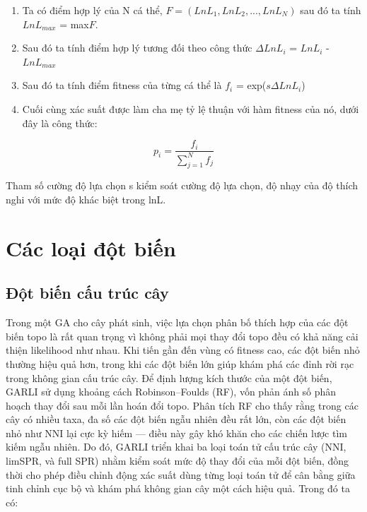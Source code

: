 \documentclass[12pt,a4paper]{report}
\begin{document}
\begin{enumerate}
    \item Ta có điểm hợp lý của N cá thể, \(F = (LnL_1, LnL_2 , ..., LnL_N)\) sau đó ta tính \(LnL_{max}\) = max\(F\).
    \item Sau đó ta tính điểm hợp lý tương đối theo công thức \(\Delta LnL_i\) = \(LnL_i\) - \(LnL_{max}\) 
    \item Sau đó ta tính điểm fitness của từng cá thể là \(f_i\) = exp(\(s\Delta LnL_i\))
    \item Cuối cùng xác suất được làm cha mẹ tỷ lệ thuận với hàm fitness của nó, dưới đây là công thức:
\end{enumerate}

\begin{equation}
    p_i = \frac{f_i}{\sum_{j=1}^{N} f_j}
    \label{eq:placeholder_label}
\end{equation}

Tham số cường độ lựa chọn s kiểm soát cường độ lựa chọn, độ nhạy của độ thích nghi với mức độ khác biệt trong lnL.

\section{Các loại đột biến}
\subsection{Đột biến cấu trúc cây}

Trong một GA cho cây phát sinh, việc lựa chọn phân bố thích hợp của các đột biến topo là rất quan trọng vì không phải mọi thay đổi topo đều có khả năng cải thiện likelihood như nhau. Khi tiến gần đến vùng có fitness cao, các đột biến nhỏ thường hiệu quả hơn, trong khi các đột biến lớn giúp khám phá các đỉnh rời rạc trong không gian cấu trúc cây. Để định lượng kích thước của một đột biến, GARLI sử dụng khoảng cách Robinson–Foulds (RF), vốn phản ánh số phân hoạch thay đổi sau mỗi lần hoán đổi topo. Phân tích RF cho thấy rằng trong các cây có nhiều taxa, đa số các đột biến ngẫu nhiên đều rất lớn, còn các đột biến nhỏ như NNI lại cực kỳ hiếm — điều này gây khó khăn cho các chiến lược tìm kiếm ngẫu nhiên. Do đó, GARLI triển khai ba loại toán tử cấu trúc cây (NNI, limSPR, và full SPR) nhằm kiểm soát mức độ thay đổi của mỗi đột biến, đồng thời cho phép điều chỉnh động xác suất dùng từng loại toán tử để cân bằng giữa tinh chỉnh cục bộ và khám phá không gian cây một cách hiệu quả. Trong đó ta có:
\end{document}
